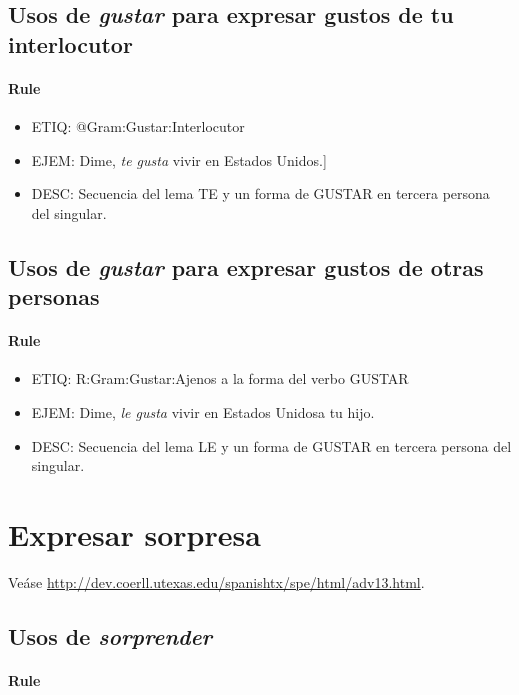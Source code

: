 \documentclass[11pt]{report}
\begin{document}
\subsection{Usos de \emph{gustar} para expresar gustos de tu interlocutor}
\paragraph*{Rule}
\begin{itemize}
\item ETIQ: @Gram:Gustar:Interlocutor
\item EJEM: Dime, \emph{te gusta} vivir en Estados Unidos.] 
\item DESC: Secuencia del lema TE y un forma de GUSTAR en tercera persona del singular.
\end{itemize}

\subsection{Usos de \emph{gustar} para expresar gustos de otras personas}
\paragraph*{Rule}
\begin{itemize}
\item ETIQ: R:Gram:Gustar:Ajenos a la forma del verbo GUSTAR
\item EJEM: Dime, \emph{le gusta} vivir en Estados Unidosa tu hijo.
\item DESC: Secuencia del lema LE y un forma de GUSTAR en tercera persona del singular.
\end{itemize}

\section{Expresar sorpresa}
Veáse \url{http://dev.coerll.utexas.edu/spanishtx/spe/html/adv13.html}.

\subsection{Usos de \emph{sorprender}}
\paragraph*{Rule}
\end{document}
